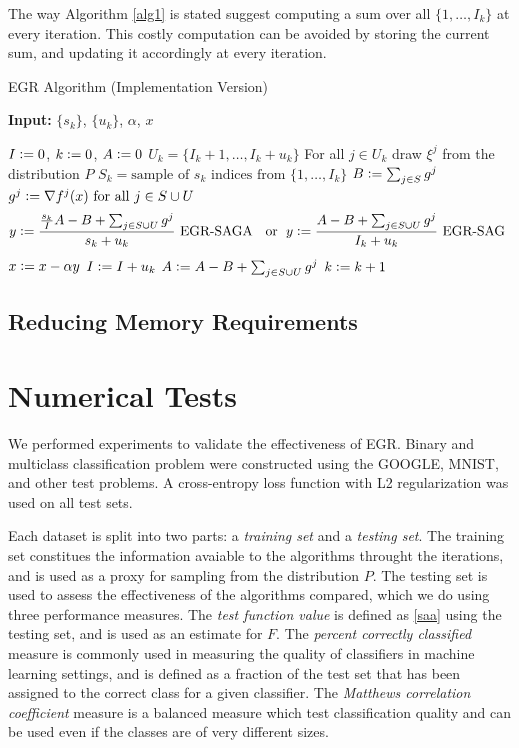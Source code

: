 \documentclass[11pt]{article}
\newcommand{\defeqq}{\vcentcolon=}
\begin{document}
The way Algorithm \ref{alg1} is stated suggest computing a sum over all $\{1, \ldots ,I_k \} $ at every iteration. This costly computation can be avoided by storing the current sum, and updating it accordingly at every iteration. 

  \bigskip
  \begin{algorithm}
  	[H] 
  	\caption{EGR Algorithm (Implementation Version)}
  	\label{alg1-IMP}
  	{\bf Input:} $\{ s_k\} $, $\{ u_k \}$, $\alpha$, $x$
  	\begin{algorithmic}
  		[1] 
  		\State $I \defeqq 0$, $k \defeqq 0$, $A \defeqq 0$
  		\Loop 
  		\State $U_k =\{I_{k}+1,\ldots, I_{k}+u_k \}$ 
  		\State For  all $j \in U_k$ draw $\xi^j$ from the distribution $P$ 
  		\State $S_k = \mbox{sample of } s_k \mbox{ indices from }\{ 1, \ldots ,I_{k}\}$ 
  		\State $B \defeqq \sum_{j \in S} g^j$ 
  		\State $g^j \defeqq  \nabla f^j(x) \mbox{ for all } j \in S\cup U$ 
  		\State 
  		\begin{equation}
  			y \defeqq  \frac{\frac{s_k}{I} A - B +\sum_{j \in S\cup U}g^j}{s_k+u_k} \mbox{ EGR-SAGA } \; \mbox{ or } \; y \defeqq  \frac{A - B +\sum_{j \in S\cup U}g^j}{I_k+u_k} \mbox{ EGR-SAG } 
  		\end{equation}
  		\State $x  \defeqq  x - \alpha y$ 
  		\State $I  \defeqq  I +u_k$ 
  		\State $A  \defeqq  A - B+ \sum_{j \in S\cup U}g^j$ 
  		\State $k \defeqq k+1$ 
  		\EndLoop 
  	\end{algorithmic}
  \end{algorithm}
  
  
  \subsection{Reducing Memory Requirements}
  
  
\section{Numerical Tests} \label{numerical}
 
 We performed experiments to validate the effectiveness of EGR. Binary and multiclass classification problem were constructed using the GOOGLE, MNIST, and other test problems. A cross-entropy loss function with L2 regularization was used on all test sets.

 Each dataset is split into two parts: a \emph{training set} and a \emph{testing set}. The training set constitues the information avaiable to the algorithms throught the iterations, and is used as a proxy for sampling from the distribution $P$.  The testing set is used to assess the effectiveness of the algorithms compared, which we do using three performance measures. The \emph{test function value} is defined as \eqref{saa} using the testing set, and is used as an estimate for $F$. The \emph{percent correctly classified} measure is commonly used in measuring the quality of classifiers in machine learning settings, and is defined as a fraction of the test set that has been assigned to the correct class for a given classifier. The \emph{Matthews correlation coefficient} measure is a balanced measure which test classification quality and can be used even if the classes are of very different sizes.
\end{document}
